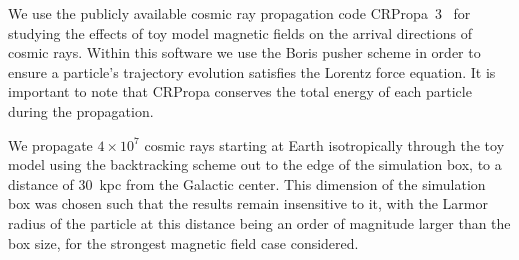\documentclass[usenatbib]{mnras}
\begin{document}
We use the publicly available cosmic ray propagation code CRPropa~3~\citep{CRPropa3_2016} for studying the effects of toy model magnetic fields on the arrival directions of cosmic rays. Within this software we use the Boris pusher scheme in order to ensure a particle's trajectory evolution satisfies the Lorentz force equation. It is important to note that CRPropa conserves the total energy of each particle during the propagation.

We propagate $4 \times 10^7$ cosmic rays starting at Earth isotropically through the toy model using the backtracking scheme out to the edge of the simulation box, to a distance of 30~kpc from the Galactic center. This dimension of the simulation box was chosen such that the results remain insensitive to it, with the Larmor radius of the particle at this distance being an order of magnitude larger than the box size, for the strongest magnetic field case considered.

\end{document}
